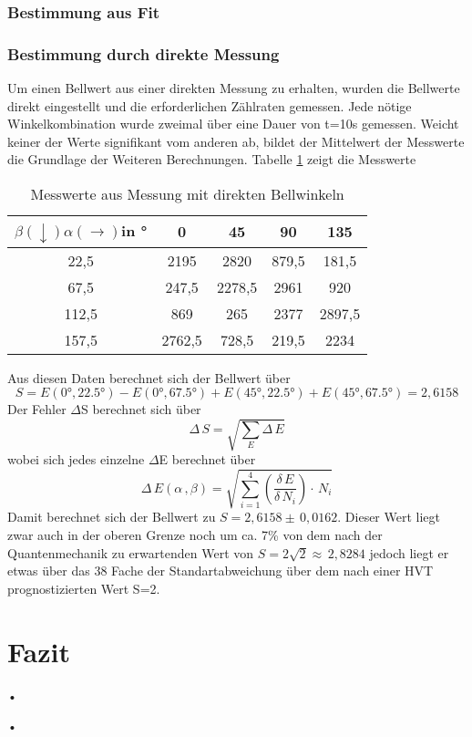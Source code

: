 \documentclass[twoside,colorback,accentcolor=tud4c,11pt]{tudreport}
\begin{document}
\subsection{Bestimmung aus Fit}
\subsection{Bestimmung durch direkte Messung}
Um einen Bellwert aus einer direkten Messung zu erhalten, wurden die Bellwerte direkt eingestellt und die erforderlichen Zählraten gemessen. Jede nötige Winkelkombination wurde zweimal über eine Dauer von t=10s gemessen. Weicht keiner der Werte signifikant vom anderen ab, bildet der Mittelwert der Messwerte die Grundlage der Weiteren Berechnungen. Tabelle \ref{bellwerte} zeigt die Messwerte
\begin{table}[H]\label{bellwerte}
\renewcommand*{\arraystretch}{1.2}
\centering
\begin{tabular}{|c|c|c|c|c|}
\hline 
$\beta(\downarrow)\alpha(\rightarrow)$in ° & 0 & 45 & 90 & 135 \\ 
\hline 
22,5 & 2195 & 2820 & 879,5 & 181,5 \\ 
\hline 
67,5 & 247,5 & 2278,5 & 2961 & 920 \\ 
\hline 
112,5 & 869 & 265 & 2377 & 2897,5 \\ 
\hline 
157,5 & 2762,5 & 728,5 & 219,5 & 2234 \\ 
\hline 
\end{tabular} 
\caption{Messwerte aus Messung mit direkten Bellwinkeln}
\end{table}
Aus diesen Daten berechnet sich der Bellwert über 
\begin{equation}
S=E(0°,22.5°)-E(0°,67.5°)+E(45°,22.5°)+E(45°,67.5°)=2,6158
\end{equation}
Der Fehler $\Delta$S berechnet sich über
\begin{equation}
\Delta\,S=\sqrt{\sum_{E}\Delta\,E}
\end{equation}
wobei sich jedes einzelne $\Delta$E berechnet über
\begin{equation}
\Delta\,E(\alpha\,,\beta)=\sqrt{\sum_{i=1}^4\left(\frac{\delta\,E}{\delta\,N_{i}}\right)\cdot\,N_{i}}
\end{equation}
Damit berechnet sich der Bellwert zu $S=2,6158\pm\,0,0162$. Dieser Wert liegt zwar auch in der oberen Grenze noch um ca. 7\% von dem nach der Quantenmechanik zu erwartenden Wert von $S=2\sqrt{2}\approx\,2,8284$ jedoch liegt er etwas über das 38 Fache der Standartabweichung über dem nach einer HVT prognostizierten Wert S=2.
\chapter{Fazit}	
•
\renewcommand{\bibname}{Literatur}
\begin{thebibliography}{0}
•
\end{thebibliography}
\end{document}
